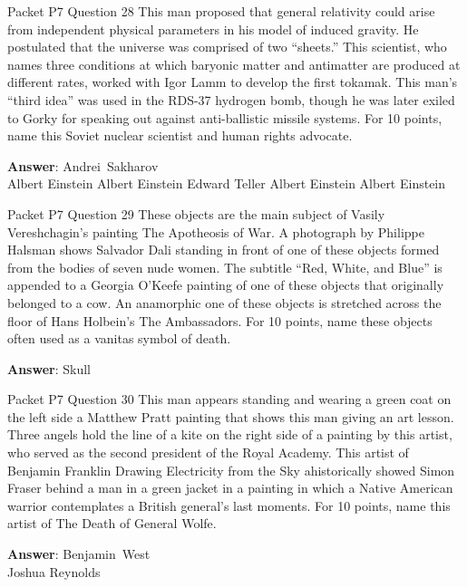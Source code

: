 \begin{frame}{Packet P7 Question 28}
This man proposed that general relativity could arise from independent physical parameters in his model   of induced gravity. He postulated that the universe was comprised of two “sheets.” This scientist,   who names three conditions at which baryonic matter and antimatter are produced at different rates, worked with Igor Lamm to develop the first tokamak. This man’s “third idea” was used in the RDS-37 hydrogen bomb, though   he was later exiled to Gorky for speaking out against anti-ballistic missile systems. For 10 points, name this Soviet nuclear scientist and   human rights advocate.      

\textbf{Answer}: Andrei\ Sakharov\\
 Albert Einstein
 Albert Einstein
 Edward Teller
 Albert Einstein
 Albert Einstein
\end{frame}

\begin{frame}{Packet P7 Question 29}
These objects are the main subject of Vasily Vereshchagin’s painting   The Apotheosis of War. A photograph by Philippe Halsman shows Salvador Dali standing in front of one of these objects formed from the bodies of seven nude women. The subtitle “Red, White, and Blue” is appended to a Georgia O’Keefe painting of one of these objects that originally belonged to a cow. An anamorphic one of these objects is stretched across the floor of Hans Holbein’s The Ambassadors. For 10 points,     name these objects often used as a vanitas   symbol of death.

\textbf{Answer}: Skull\\
\end{frame}

\begin{frame}{Packet P7 Question 30}
This man appears standing and wearing a green coat on the left side a Matthew Pratt painting that shows this man giving an art lesson. Three angels hold the line of a kite on the right side of a painting by this artist, who served as the second president of the   Royal Academy. This   artist of Benjamin Franklin Drawing Electricity from the Sky   ahistorically showed Simon Fraser behind   a man in a green jacket in a painting in which a Native American   warrior contemplates a British general’s last moments. For 10 points, name this artist of The Death of General Wolfe.

\textbf{Answer}: Benjamin\ West\\
 Joshua Reynolds
\end{frame}

